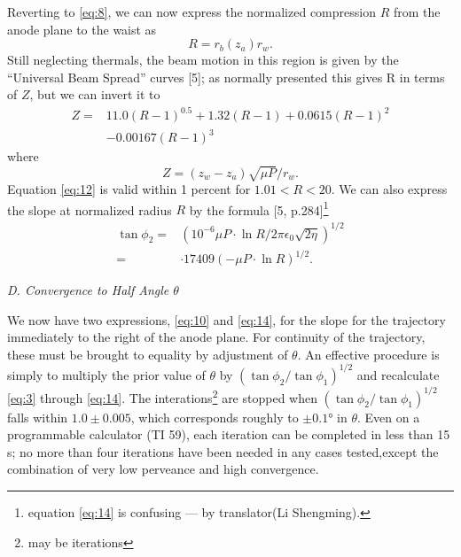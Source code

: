 \documentclass[10pt,a4paper,UTF8,fleqn]{article}
\begin{document}
Reverting to \eqref{eq:8}, we can now express the normalized compression $ R $ from the anode plane to the waist as
\begin{equation} \label{eq:11}
	R = r_b(z_a)r_w.
\end{equation}
Still neglecting thermals, the beam motion in this region is given by the ``Universal Beam Spread'' curves [5]; as normally presented this gives R in terms of $ Z $, but we can invert it to
\begin{equation}\label{eq:12}
\begin{split} 
Z = &11.0\left(R-1\right)^{0.5} + 1.32\left(R-1\right) + 0.0615\left(R-1\right)^2\\&-0.00167\left(R-1\right)^3 
\end{split}
\end{equation}
where
\begin{equation} \label{eq:13}
	Z = \left(z_w - z_a\right)\sqrt{\mu P}/r_w.
\end{equation}
Equation \eqref{eq:12} is valid within 1 percent for $ 1.01<R<20 $. We can also express the slope at normalized radius $ R $ by the formula [5, p.284]\footnote{equation \eqref{eq:14} is confusing --- by translator(Li Shengming).}
\begin{equation} \label{eq:14}
	\begin{aligned}
	\tan\phi_2 =& \left(10^{-6}\mu P\cdot\ln R/2\pi\epsilon_0\sqrt{2\eta}\right)^{1/2}\\=&\cdot 17409\left(-\mu P\cdot\ln R\right)^{1/2}.
	\end{aligned}
\end{equation}


\vspace{0.5ex}\textit{D. Convergence to Half Angle $ \theta $}\vspace{0.5ex}

We now have two expressions, \eqref{eq:10} and \eqref{eq:14}, for the slope for the trajectory immediately to the right of the anode plane. For continuity of the trajectory, these must be brought to equality by adjustment of $ \theta $. An effective procedure is simply to multiply the prior value of $ \theta $ by $(\tan \phi_2/\tan\phi_1)^{1/2}$ and recalculate \eqref{eq:3} through \eqref{eq:14}. The interations\footnote{{may be iterations}} are stopped when $(\tan \phi_2/\tan\phi_1)^{1/2}$ falls within $ 1.0\pm0.005 $, which corresponds roughly to $ \pm\ang{0.1} $ in $ \theta $. Even on a programmable calculator (TI 59), each iteration can be completed in less than 15\,s; no more than four iterations have been needed in any cases tested,except the combination of very low perveance and high convergence.
\end{document}
